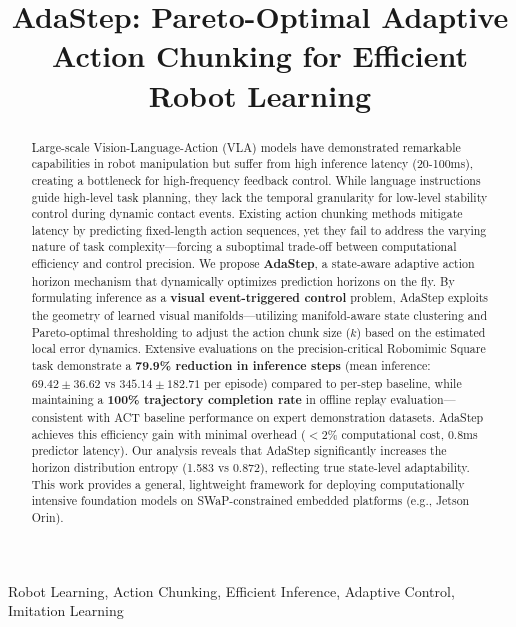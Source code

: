 \documentclass[conference]{IEEEtran}
\begin{document}
\title{AdaStep: Pareto-Optimal Adaptive Action Chunking for Efficient Robot Learning}

\author{
}

\maketitle

\begin{abstract}
Large-scale Vision-Language-Action (VLA) models have demonstrated remarkable capabilities in robot manipulation but suffer from high inference latency (20-100ms), creating a bottleneck for high-frequency feedback control. While language instructions guide high-level task planning, they lack the temporal granularity for low-level stability control during dynamic contact events. Existing action chunking methods mitigate latency by predicting fixed-length action sequences, yet they fail to address the varying nature of task complexity---forcing a suboptimal trade-off between computational efficiency and control precision. We propose \textbf{AdaStep}, a state-aware adaptive action horizon mechanism that dynamically optimizes prediction horizons on the fly. By formulating inference as a \textbf{visual event-triggered control} problem, AdaStep exploits the geometry of learned visual manifolds---utilizing manifold-aware state clustering and Pareto-optimal thresholding to adjust the action chunk size ($k$) based on the estimated local error dynamics. Extensive evaluations on the precision-critical Robomimic Square task demonstrate a \textbf{79.9\% reduction in inference steps} (mean inference: $69.42 \pm 36.62$ vs $345.14 \pm 182.71$ per episode) compared to per-step baseline, while maintaining a \textbf{100\% trajectory completion rate} in offline replay evaluation---consistent with ACT baseline performance on expert demonstration datasets. AdaStep achieves this efficiency gain with minimal overhead ($<2\%$ computational cost, 0.8ms predictor latency). Our analysis reveals that AdaStep significantly increases the horizon distribution entropy (1.583 vs 0.872), reflecting true state-level adaptability. This work provides a general, lightweight framework for deploying computationally intensive foundation models on SWaP-constrained embedded platforms (e.g., Jetson Orin).
\end{abstract}

\begin{IEEEkeywords}
Robot Learning, Action Chunking, Efficient Inference, Adaptive Control, Imitation Learning
\end{IEEEkeywords}
\end{document}
